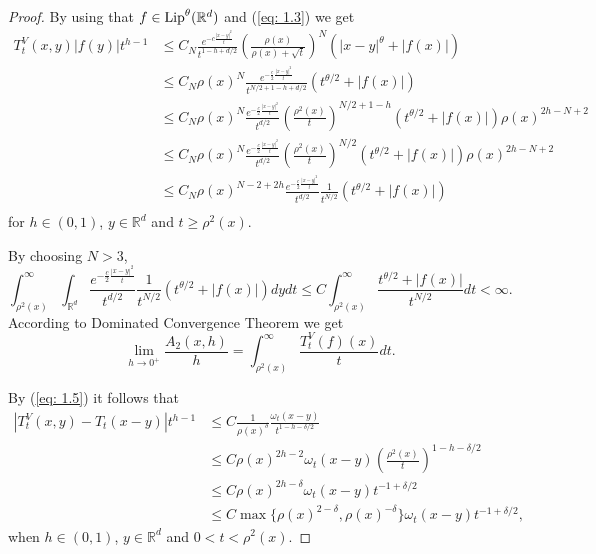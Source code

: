 \documentclass[10pt, a4paper, reqno]{amsart}
\theoremstyle{definition}
\theoremstyle{remark}
\newcommand{\RR}{\mathbb{R}}
\newcommand{\Lip}{\textup{Lip}}
\numberwithin{equation}{section}
\begin{document}
\begin{proof}
By using that $f\in \Lip^\theta(\mathbb{R}^d)$ and (\ref{eq: 1.3}) we get
\begin{align*}
T_t^V(x,y)|f(y)|t^{h-1}&\le {C_N}\frac{e^{-c\frac{|x-y|^2}{t}}}{t^{1-h+d/2}} \left(\frac{\rho(x)}{\rho(x)+\sqrt{t}}\right)^{{N}}(|x-y|^\theta+|f(x)|)\\
&\le {C_N}\rho(x)^{{N}}\frac{e^{-\frac c2\frac{|x-y|^2}{t}}}{t^{{N/2+1}-h+d/2}}(t^{\theta/2}+|f(x)|)\\
&\le {C_N}\rho(x)^{{N}}\frac{e^{-\frac c2\frac{|x-y|^2}{t}}}{t^{d/2}}\left(\frac{\rho^2(x)}{t}\right)^{{N/2+1}-h}(t^{\theta/2}+|f(x)|)\rho(x)^{2h-{N+2}}\\
&\le {C_N}\rho(x)^{{N}}\frac{e^{-\frac c2\frac{|x-y|^2}{t}}}{t^{d/2}}\left(\frac{\rho^2(x)}{t}\right)^{{N/2}}(t^{\theta/2}+|f(x)|)\rho(x)^{2h-{N+2}}\\
&\le {C_N}\rho(x)^{{N-2}+2h}\frac{e^{-\frac c2\frac{|x-y|^2}{t}}}{t^{d/2}}\frac{1}{t^{{N/2}}}(t^{\theta/2}+|f(x)|)\\
\end{align*}
for $h\in (0,1)$, $y\in \mathbb{R}^d$ and $t\ge \rho^2(x)$.

{By choosing $N>3$,}
\[
\int_{\rho^2(x)}^\infty \int_{\mathbb{R}^d}\frac{e^{-\frac c2\frac{|x-y|^2}{t}}}{t^{d/2}}\frac{1}{t^{{N/2}}}(t^{\theta/2}+|f(x)|)dydt\le C\int_{\rho^2(x)}^\infty\frac{t^{\theta/2}+|f(x)|}{t^{{N/2}}}dt<\infty.
\]
According to Dominated Convergence Theorem we get
\[
\lim_{h\to 0^+}\frac{A_2(x,h)}{h}=\int_{\rho^2(x)}^\infty\frac{T_t^V(f)(x)}{t}dt.
\]


By (\ref{eq: 1.5}) it follows that
\begin{align*}
 |T_t^V(x,y)-T_t(x-y)|t^{h-1}&\le C\frac{1}{\rho(x)^\delta}\frac{\omega_t(x-y)}{t^{1-h-\delta/2}}\\
& \le C\rho(x)^{2h-2} \omega_t(x-y) \left(\frac{\rho^2(x)}{t}\right)^{1-h-\delta/2}\\
&\le C\rho(x)^{2h-\delta}\omega_t(x-y) t^{-1+\delta/2}\\
&\le C\max\{\rho(x)^{2-\delta},\rho(x)^{-\delta}\}\omega_t(x-y)t^{-1+\delta/2},
\end{align*}
when $h\in (0,1)$, $y\in \mathbb{R}^d$ and $0<t<\rho^2(x)$.


\end{proof}
\end{document}
